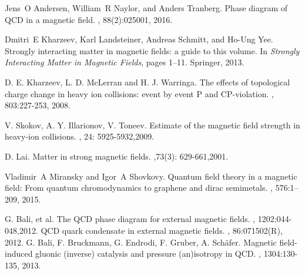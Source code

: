 \documentclass[prd, showpacs,nofootinbib,amsmath,amssymb]{revtex4}
\begin{document}
%
%
\begin{thebibliography}{99}

Jens~O Andersen, William~R Naylor, and Anders Tranberg.
\newblock Phase diagram of QCD in a magnetic field.
, 88(2):025001, 2016.

Dmitri~E Kharzeev, Karl Landsteiner, Andreas Schmitt, and Ho-Ung Yee.
\newblock Strongly interacting matter in magnetic fields: a guide to this
  volume.
\newblock In {\em Strongly Interacting Matter in Magnetic Fields}, pages 1--11.
  Springer, 2013.

D. E. Kharzeev, L. D. McLerran and H. J. Warringa. 
\newblock The effects of topological charge change in heavy ion collisions: event by event P and CP-violation. 
, 803:227-253, 2008.

V. Skokov, A. Y. Illarionov, V. Toneev. 
\newblock Estimate of the magnetic field strength in heavy-ion collisions. 
, 24: 5925-5932,2009.

D. Lai. 
\newblock Matter in strong magnetic fields.
,73(3): 629-661,2001.

Vladimir~A Miransky and Igor~A Shovkovy.
\newblock Quantum field theory in a magnetic field: From quantum chromodynamics
  to graphene and dirac semimetals.
, 576:1--209, 2015.

G. Bali, et al. 
\newblock The QCD phase diagram for external magnetic fields. 
, 1202:044-048,2012.
\newblock QCD quark condensate in external magnetic fields.
, 86:071502(R), 2012.
G. Bali, F. Bruckmann, G. Endrodi, F. Gruber, A. Sch\"{a}fer. 
\newblock Magnetic field-induced gluonic (inverse) catalysis and pressure (an)isotropy in QCD. 
, 1304:130-135, 2013.


\end{thebibliography}
\end{document}
